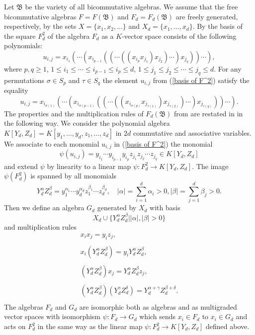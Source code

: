 \documentclass{amsart}[12pt]
\theoremstyle{definition}
\begin{document}
Let $\mathfrak B$ be the variety of all bicommutative algebras.
We assume that the free bicommutative algebras $F=F({\mathfrak B})$ and $F_d=F_d({\mathfrak B})$ are freely generated, respectively,
by the sets $X=\{x_1,x_2,\ldots\}$ and $X_d=\{x_1,\ldots,x_d\}$.
By \cite{DIT} the basis of the square $F^2_d$ of the algebra $F_d$ as a $K$-vector space consists of the following polynomials:
\begin{equation}\label{basis of F^2}
u_{i,j}=x_{i_1}(\cdots(x_{i_{p-1}}((\cdots((x_{i_p} x_{j_1})x_{j_2})\cdots)x_{j_q}))\cdots),
\end{equation}
where $p,q\geq 1$, $1\leq i_1\leq\cdots\leq i_{p-1}\leq i_p\leq d$, $1\leq j_1\leq j_2\leq\cdots\leq j_q\leq d$.
For any permutations $\sigma\in S_p$ and $\tau\in S_q$ the element $u_{i,j}$ from (\ref{basis of F^2}) satisfy the equality
\begin{equation}\label{action of Sm x Sn on the square}
u_{i,j}=x_{i_{\sigma(1)}}(\cdots(x_{i_{\sigma(p-1)}}((\cdots((x_{i_{\sigma(p)}} x_{j_{\tau(1)}})x_{j_{\tau(2)}})\cdots)x_{j_{\tau(q)}}))\cdots).
\end{equation}
The properties and the multiplication rules of $F_d({\mathfrak B})$ from \cite{DIT} are restated in \cite{DZ} in the following way.
We consider the polynomial algebra $K[Y_d,Z_d]=K[y_1,\ldots,y_d,z_1,\ldots,z_d]$ in $2d$ commutative and associative variables.
We associate to each monomial $u_{i,j}$ in (\ref{basis of F^2}) the monomial
\[
\psi(u_{i,j})=y_{i_1}\cdots y_{i_{p-1}}y_{i_p} z_{j_1}z_{j_2}\cdots z_{j_q}\in K[Y_d,Z_d]
\]
and extend $\psi$ by linearity to a linear map $\psi:F_d^2\to K[Y_d,Z_d]$. The image $\psi(F_d^2)$ is spanned by all monomials
\[
Y_d^{\alpha}Z_d^{\beta}=y_1^{\alpha_1}\cdots y_d^{\alpha_d}z_1^{\beta_1}\cdots z_d^{\beta_d},\quad
\vert\alpha\vert=\sum_{i=1}^d\alpha_i>0,\vert\beta\vert=\sum_{j=1}^d\beta_j>0.
\]
Then we define an algebra $G_d$ generated by $X_d$ with basis
\[
X_d\cup\{Y_d^{\alpha}Z_d^{\beta}\mid\vert\alpha\vert,\vert\beta\vert>0\}
\]
and multiplication rules
\begin{equation}\label{multiplication in G_d}
\begin{array}{c}
x_ix_j=y_iz_j,\\
\\
x_i(Y_d^{\alpha}Z_d^{\beta})=y_iY_d^{\alpha}Z_d^{\beta},\\
\\
(Y_d^{\alpha}Z_d^{\beta})x_j=Y_d^{\alpha}Z_d^{\beta}z_j,\\
\\
(Y_d^{\alpha}Z_d^{\beta})(Y_d^{\gamma}Z_d^{\delta})=Y_d^{\alpha+\gamma}Z_d^{\beta+\delta}.\\
\end{array}
\end{equation}
The algebras $F_d$ and $G_d$ are isomorphic both as algebras and as multigraded vector spaces with isomorphism $\psi:F_d\to G_d$
which sends $x_i\in F_d$ to $x_i\in G_d$ and acts on $F_d^2$ in the same way as the linear map
$\psi:F_d^2\to K[Y_d,Z_d]$ defined above.
\end{document}
